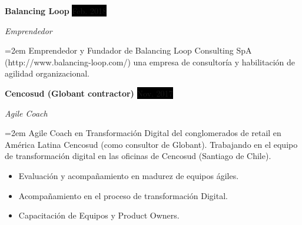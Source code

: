 \documentclass[paper=a4,fontsize=11pt]{scrartcl} %
\newcommand{\sepspace}{\vspace*{1em}}		%
\newcommand{\EducationEntry}[4]{
		\noindent \textbf{#1} \hfill      %
		\colorbox{Black}{%
			\parbox{6em}{%
			\hfill\color{White}#2}} \par  %
		\noindent \textit{#3} \par        %
		\noindent\hangindent=2em\hangafter=0 \small #4 %
		\normalsize \par}
\newcommand{\WorkEntry}[4]{				  %
		\noindent \textbf{#1} \hfill      %
		\colorbox{Black}{\color{White}#2} \par  %
		\noindent \textit{#3} \par              %
		\noindent\hangindent=2em\hangafter=0 \small #4 %
		\normalsize \par}
\begin{document}
\WorkEntry{Balancing Loop}{Feb. 2018}{Emprendedor}{
Emprendedor y Fundador de Balancing Loop Consulting SpA (http://www.balancing-loop.com/) una empresa de consultoría y habilitación de agilidad organizacional.
}

\WorkEntry{Cencosud (Globant contractor)}{Nov. 2017}{Agile Coach}{
Agile Coach en Transformación Digital del conglomerados de retail en América Latina Cencosud (como consultor de Globant). Trabajando en el equipo de transformación digital en las oficinas de Cencosud (Santiago de Chile).
\begin{itemize}
\item Evaluación y acompañamiento en madurez de equipos ágiles.
\item Acompañamiento en el proceso de transformación Digital.
\item Capacitación de Equipos y Product Owners.
\end{itemize}
}

\sepspace
\end{document}
